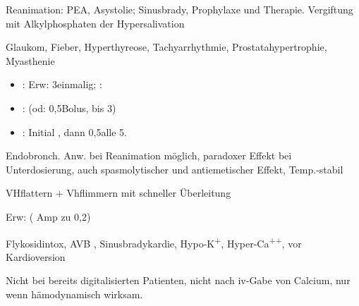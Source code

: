 {
\begin{MedikamentCharakteristika}
  \item[{\TxItemSpezialitaeten}] 
  \item[{\TxItemIndikation}] Reanimation: PEA, Asystolie; Sinusbrady, 
  Prophylaxe und Therapie.
  Vergiftung mit Alkylphosphaten der Hypersalivation
  \item[{\TxItemKontraindikation}] Glaukom, Fieber, Hyperthyreose, 
  Tachyarrhythmie,
  Prostatahypertrophie, Myasthenie
  \item[{\TxItemDosierung}] \begin{itemize}
    \item {}: Erw: 3\Mg* einmalig; :
    \item {}: \MgKg* (od:
    0,5\Mg* Bolus, bis 3\Mg*)
    \item {}: Initial \Mg, dann 
    0,5\Mg* alle
    5\Min*.
  \end{itemize}
  \item[{\TxItemAnmerkung}] Endobronch. Anw. bei Reanimation möglich, 
  paradoxer Effekt bei
  Unterdosierung, auch spasmolytischer und antiemetischer Effekt, 
  Temp.-stabil
\end{MedikamentCharakteristika}}
{}



{
\begin{MedikamentCharakteristika}
  \item[{\TxItemSpezialitaeten}] 
  \item[{\TxItemIndikation}] VHflattern + Vhflimmern mit schneller
  Überleitung
  \item[{\TxItemDosierung}] Erw: \Mg* 
  ( Amp zu
  0,2\Mg*)
  \item[{\TxItemKontraindikation}]  Flykosidintox, AVB 
  , Sinusbradykardie,
  Hypo-K\textsuperscript{+}, Hyper-Ca\textsuperscript{++}, vor 
  Kardioversion
  \item[{\TxItemCave}] 
  \begin{Danger}
    \item Nicht bei bereits digitalisierten 
      Patienten, nicht nach iv-Gabe von
      Calcium, nur wenn hämodynamisch wirksam.
  \end{Danger}
\end{MedikamentCharakteristika}}
{}




